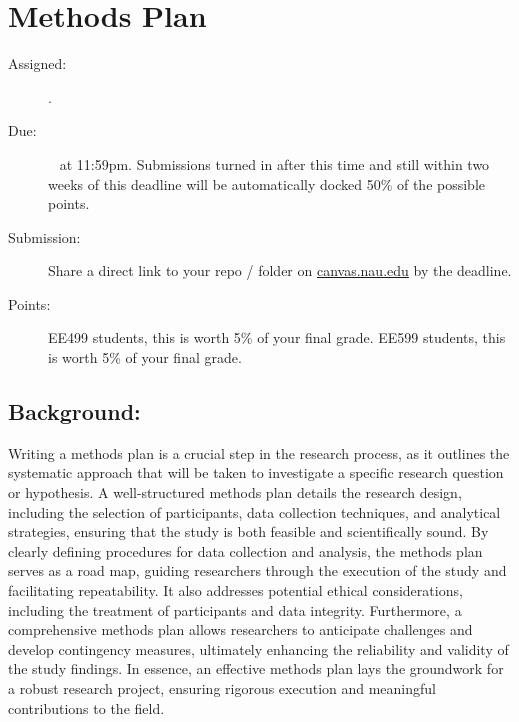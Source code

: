 \documentclass[11pt]{article}
\begin{document}
\section{Methods Plan}
\begin{description}
	\item [Assigned:] \wkTenTu.
	\item [Due:] \wkElevenTu~ at 11:59pm. Submissions turned in after this time and still within two weeks of this deadline will be automatically docked 50\% of the possible points. %
	\item [Submission:] Share a direct link to your repo / folder on \href{https://canvas.nau.edu}{canvas.nau.edu} by the deadline.
	\item [Points:] EE499 students, this is worth 5\% of your final grade.  EE599 students, this is worth 5\% of your final grade.
\end{description}

\subsection*{Background:}
Writing a methods plan is a crucial step in the research process, as it outlines the systematic approach that will be taken to investigate a specific research question or hypothesis. A well-structured methods plan details the research design, including the selection of participants, data collection techniques, and analytical strategies, ensuring that the study is both feasible and scientifically sound. By clearly defining procedures for data collection and analysis, the methods plan serves as a road map, guiding researchers through the execution of the study and facilitating repeatability. It also addresses potential ethical considerations, including the treatment of participants and data integrity. Furthermore, a comprehensive methods plan allows researchers to anticipate challenges and develop contingency measures, ultimately enhancing the reliability and validity of the study findings. In essence, an effective methods plan lays the groundwork for a robust research project, ensuring rigorous execution and meaningful contributions to the field.
\end{document}
